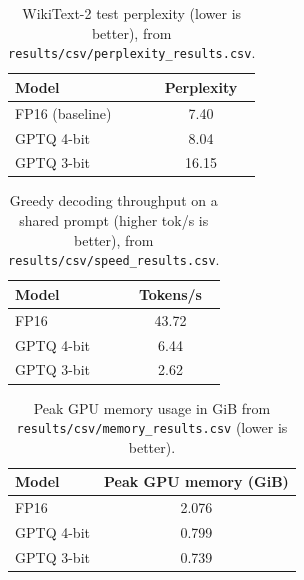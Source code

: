 
\begin{table}[t]
  \caption{WikiText-2 test perplexity (lower is better), from \texttt{results/csv/perplexity\_results.csv}.}
  \label{tab:ppl}
  \centering
  \small
  \begin{tabular}{lc}
    \toprule
    \textbf{Model} & \textbf{Perplexity} \\
    \midrule
    FP16 (baseline)      & 7.40 \\
    GPTQ 4-bit           & 8.04 \\
    GPTQ 3-bit           & 16.15 \\
    \bottomrule
  \end{tabular}
\end{table}

\begin{table}[t]
  \caption{Greedy decoding throughput on a shared prompt (higher tok/s is better), from \texttt{results/csv/speed\_results.csv}.}
  \label{tab:speed}
  \centering
  \small
  \begin{tabular}{lc}
    \toprule
    \textbf{Model} & \textbf{Tokens/s} \\
    \midrule
    FP16      & 43.72 \\
    GPTQ 4-bit & 6.44 \\
    GPTQ 3-bit & 2.62 \\
    \bottomrule
  \end{tabular}
\end{table}

\begin{table}[t]
  \caption{Peak GPU memory usage in GiB from \texttt{results/csv/memory\_results.csv} (lower is better).}
  \label{tab:memory}
  \centering
  \small
  \begin{tabular}{lc}
    \toprule
    \textbf{Model} & \textbf{Peak GPU memory (GiB)} \\
    \midrule
    FP16      & 2.076 \\
    GPTQ 4-bit & 0.799 \\
    GPTQ 3-bit & 0.739 \\
    \bottomrule
  \end{tabular}
\end{table}
